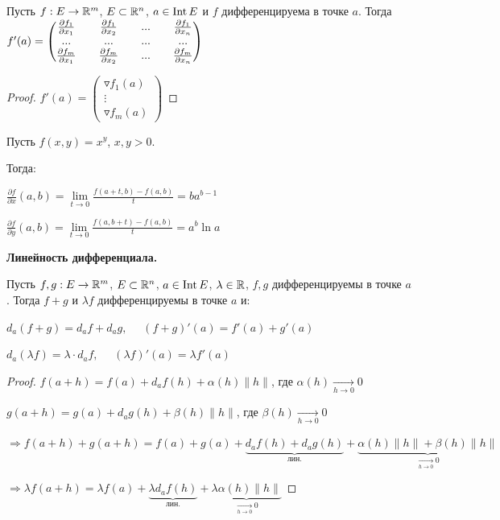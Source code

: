 \begin{corollary}
    Пусть $f: E\rightarrow \mathbb{R}^m$, $E\subset \mathbb{R}^n$, $a\in \operatorname{Int} E$ и $f$ дифференцируема в точке $a$. Тогда $f'(a)=\begin{pmatrix}
        \pdv{f_1}{x_1}(a) && \pdv{f_1}{x_2}(a) && ... && \pdv{f_1}{x_n}(a) \\
        ... && ... && ... && ... \\
        \pdv{f_m}{x_1}(a) && \pdv{f_m}{x_2}(a) && ... && \pdv{f_m}{x_n}(a)
    \end{pmatrix}$
\end{corollary}

\begin{proof}
    $f'(a)=\begin{pmatrix}
        \triangledown f_1(a) \\ \vdots \\ \triangledown f_m(a)
    \end{pmatrix}$
\end{proof}

\begin{example}
    Пусть $f(x, y)=x^y$, $x, y>0$.

    Тогда: 
    
    $\frac{\partial f}{\partial x}(a, b)=\lim\limits_{t\rightarrow 0}\frac{f(a + t, b)- f(a, b)}{t}=ba^{b-1}$

    $\frac{\partial f}{\partial y}(a, b)=\lim\limits_{t\rightarrow 0}\frac{f(a, b + t)- f(a, b)}{t}=a^b \ln a$
\end{example}

\begin{theorem}
    \textbf{Линейность дифференциала.}

    Пусть $f, g: E\rightarrow \mathbb{R}^m$, $E\subset \mathbb{R}^n$, $a\in \operatorname{Int} E$, $\lambda\in \mathbb{R}$, $f, g$ дифференцируемы в точке $a$. Тогда $f+g$ и $\lambda f$  дифференцируемы в точке $a$ и:
    
    $d_a(f+g)=d_a f+d_a g,\quad$ $(f+g)'(a)=f'(a)+g'(a)$

    $d_a(\lambda f)=\lambda\cdot  d_a f,\quad$ $(\lambda f)'(a)=\lambda f'(a)$
\end{theorem}

\begin{proof}
    $f(a+h)=f(a)+d_af(h)+\alpha (h)\| h\|$, где $\alpha (h)\underset{h\rightarrow 0}{\rightarrow}0$

    $g(a+h)=g(a)+d_ag(h)+\beta (h)\| h\|$, где $\beta (h)\underset{h\rightarrow 0}{\rightarrow}0$

    $\Rightarrow f(a+h)+g(a+h)=f(a)+g(a)+\underbrace{d_af(h)+d_ag(h)}_{\text{лин.}}+\underbrace{\alpha (h)\| h\|+\beta (h)\| h\|}_{\underset{h\rightarrow 0}{\rightarrow}0}$

    $\Rightarrow \lambda f(a+h)=\lambda f(a)+\underbrace{\lambda d_af(h)}_{\text{лин.}}+\underbrace{\lambda \alpha (h)\| h\|}_{\underset{h\rightarrow 0}{\rightarrow}0}$
\end{proof}

